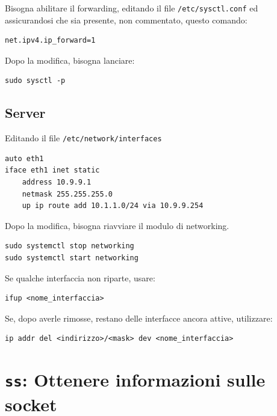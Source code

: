 \documentclass[a4paper]{report}
\newenvironment{ricordati}{\begin{tcolorbox}[fonttitle=\sffamily\bfseries\large,title=Ricordati,colframe=orange!75!white]}{\end{tcolorbox}}
\newenvironment{code}{\begin{tcolorbox}[size=small]}{\end{tcolorbox}}
\begin{document}
Bisogna abilitare il forwarding, editando il file \texttt{/etc/sysctl.conf} ed assicurandosi che sia presente, non commentato, questo comando:

\begin{code}
\begin{lstlisting}
net.ipv4.ip_forward=1
\end{lstlisting}
\end{code}

\begin{ricordati}
	Dopo la modifica, bisogna lanciare:
\begin{lstlisting}
sudo sysctl -p
\end{lstlisting}
\end{ricordati}

\subsection{Server}

Editando il file \texttt{/etc/network/interfaces}

\begin{code}
\begin{lstlisting}
auto eth1
iface eth1 inet static
	address 10.9.9.1
	netmask 255.255.255.0
	up ip route add 10.1.1.0/24 via 10.9.9.254
\end{lstlisting}
\end{code}

\begin{ricordati}
Dopo la modifica, bisogna riavviare il modulo di networking.
\begin{lstlisting}
sudo systemctl stop networking
sudo systemctl start networking
\end{lstlisting}

Se qualche interfaccia non riparte, usare:
\begin{lstlisting}
ifup <nome_interfaccia>
\end{lstlisting}

Se, dopo averle rimosse, restano delle interfacce ancora attive, utilizzare:
\begin{lstlisting}
ip addr del <indirizzo>/<mask> dev <nome_interfaccia>
\end{lstlisting}
\end{ricordati}

\section{\texttt{ss}: Ottenere informazioni sulle socket}
\end{document}
